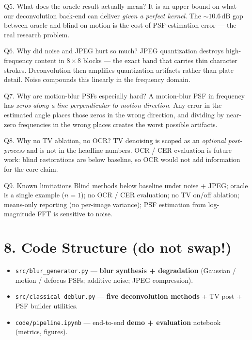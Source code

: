 \documentclass[10pt,a4paper]{article}
\begin{document}
\begin{qabox}{Q5. What does the oracle result actually mean?}
It is an upper bound on what our deconvolution back-end can deliver \emph{given
a perfect kernel}. The $\sim 10.6\,\text{dB}$ gap between oracle and blind on
motion is the cost of PSF-estimation error --- the real research problem.
\end{qabox}

\begin{qabox}{Q6. Why did noise and JPEG hurt so much?}
JPEG quantization destroys high-frequency content in $8{\times}8$ blocks --- the
exact band that carries thin character strokes. Deconvolution then amplifies
quantization artifacts rather than plate detail. Noise compounds this linearly
in the frequency domain.
\end{qabox}

\begin{qabox}{Q7. Why are motion-blur PSFs especially hard?}
A motion-blur PSF in frequency has \emph{zeros along a line perpendicular to
motion direction}. Any error in the estimated angle places those zeros in the
wrong direction, and dividing by near-zero frequencies in the wrong places
creates the worst possible artifacts.
\end{qabox}

\begin{qabox}{Q8. Why no TV ablation, no OCR?}
TV denoising is scoped as an \emph{optional post-process} and is not in the
headline numbers. OCR / CER evaluation is future work: blind restorations are
below baseline, so OCR would not add information for the core claim.
\end{qabox}

\begin{qabox}{Q9. Known limitations}
Blind methods below baseline under noise + JPEG; oracle is a single example
($n{=}1$); no OCR / CER evaluation; no TV on/off ablation; means-only reporting
(no per-image variance); PSF estimation from log-magnitude FFT is sensitive to noise.
\end{qabox}

\section*{8. Code Structure (do not swap!)}
\begin{itemize}
  \item \texttt{src/blur\_generator.py} --- \textbf{blur synthesis + degradation} (Gaussian / motion / defocus PSFs; additive noise; JPEG compression).
  \item \texttt{src/classical\_deblur.py} --- \textbf{five deconvolution methods} + TV post + PSF builder utilities.
  \item \texttt{code/pipeline.ipynb} --- end-to-end \textbf{demo + evaluation} notebook (metrics, figures).
\end{itemize}
\end{document}
